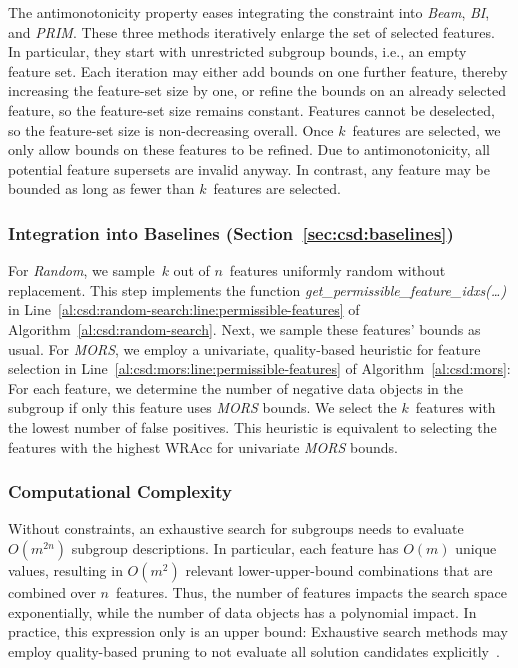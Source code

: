 \documentclass[acmsmall]{acmart} %
\theoremstyle{acmplain}
\theoremstyle{acmdefinition}
\begin{document}
The antimonotonicity property eases integrating the constraint into \emph{Beam}, \emph{BI}, and \emph{PRIM}.
These three methods iteratively enlarge the set of selected features.
In particular, they start with unrestricted subgroup bounds, i.e., an empty feature set.
Each iteration may either add bounds on one further feature, thereby increasing the feature-set size by one, or refine the bounds on an already selected feature, so the feature-set size remains constant.
Features cannot be deselected, so the feature-set size is non-decreasing overall.
Once $k$~features are selected, we only allow bounds on these features to be refined.
Due to antimonotonicity, all potential feature supersets are invalid anyway.
In contrast, any feature may be bounded as long as fewer than $k$~features are selected.

\subsubsection{Integration into Baselines (Section~\ref{sec:csd:baselines})}
\label{sec:csd:approach:cardinality:baselines}

For \emph{Random}, we sample~$k$ out of $n$~features uniformly random without replacement.
This step implements the function \emph{get\_permissible\_feature\_idxs(\dots)} in Line~\ref{al:csd:random-search:line:permissible-features} of Algorithm~\ref{al:csd:random-search}.
Next, we sample these features' bounds as usual.
For \emph{MORS}, we employ a univariate, quality-based heuristic for feature selection in Line~\ref{al:csd:mors:line:permissible-features} of Algorithm~\ref{al:csd:mors}:
For each feature, we determine the number of negative data objects in the subgroup if only this feature uses \emph{MORS} bounds.
We select the $k$~features with the lowest number of false positives.
This heuristic is equivalent to selecting the features with the highest WRAcc for univariate \emph{MORS} bounds.

\subsubsection{Computational Complexity}
\label{sec:csd:approach:cardinality:complexity}

Without constraints, an exhaustive search for subgroups needs to evaluate $O(m^{2n})$ subgroup descriptions.
In particular, each feature has $O(m)$ unique values, resulting in $O(m^2)$ relevant lower-upper-bound combinations that are combined over $n$~features.
Thus, the number of features impacts the search space exponentially, while the number 
of data objects has a polynomial impact.
In practice, this expression only is an upper bound:
Exhaustive search methods may employ quality-based pruning to not evaluate all solution candidates explicitly~\cite{atzmueller2015subgroup}.
\end{document}
